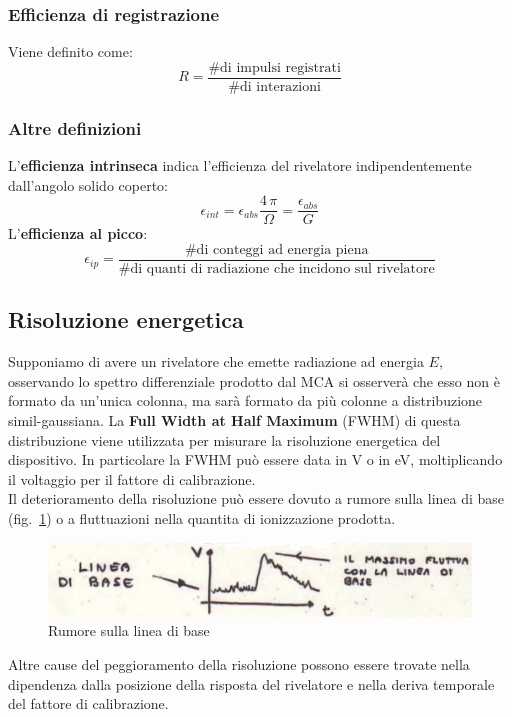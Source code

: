 \subsubsection{Efficienza di registrazione}
Viene definito come:
\begin{equation*}
R = \frac{\text{\# di impulsi registrati}}{\text{\# di interazioni}}
\end{equation*}
\subsubsection{Altre definizioni}
L'\textbf{efficienza intrinseca} indica l'efficienza del rivelatore indipendentemente dall'angolo solido coperto:
\begin{equation*}
\epsilon_{int} = \epsilon_{abs} \frac{4 \, \pi}{\Omega} = \frac{\epsilon_{abs}}{G}
\end{equation*}
L'\textbf{efficienza al picco}:
\begin{equation*}
\epsilon_{ip} = \frac{\text{\# di conteggi ad energia piena}}{\text{\# di quanti di radiazione che incidono sul rivelatore}}
\end{equation*}
\subsection{Risoluzione energetica}
Supponiamo di avere un rivelatore che emette radiazione ad energia $E$, osservando lo spettro differenziale prodotto dal MCA
si osserver\`a che esso non \`e formato da un'unica colonna, ma sar\`a formato da pi\`u colonne a distribuzione simil-gaussiana.
La \textbf{Full Width at Half Maximum} (FWHM) di questa distribuzione viene utilizzata per misurare la risoluzione energetica del dispositivo.
In particolare la FWHM pu\`o essere data in V o in eV, moltiplicando il voltaggio per il fattore di calibrazione.\\
Il deterioramento della risoluzione pu\`o essere dovuto a rumore sulla linea di base (fig.~\ref{fig:rumore}) o a fluttuazioni nella quantita di ionizzazione prodotta.
\begin{figure}[htb]
\begin{center}
\includegraphics[scale=0.8]{./Immagini/Rumore.png}
\caption{Rumore sulla linea di base}
\label{fig:rumore}
\end{center}
\end{figure}
Altre cause del peggioramento della risoluzione possono essere trovate nella dipendenza dalla posizione della risposta del rivelatore e nella deriva temporale del fattore di calibrazione.
